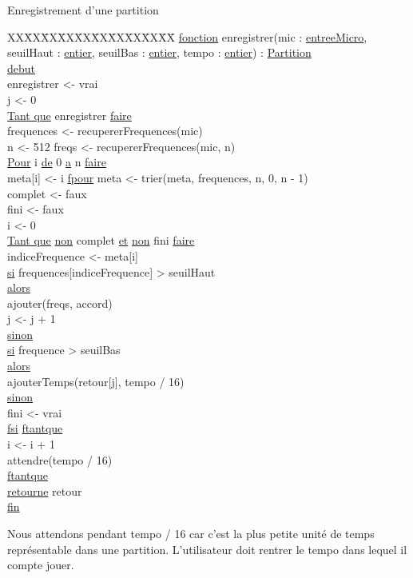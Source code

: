 Enregistrement d'une partition\newline
\begin{tabbing}
\kill XX\=XX\=XX\=XX\=XX\=XX\=XX\=XX\=XX\=XX\=
\kill
\ul{fonction} enregistrer(mic : \ul{entreeMicro}, seuilHaut :  \ul{entier}, seuilBas : \ul{entier}, tempo : \ul{entier}) : \ul{Partition}\\
\ul{debut}\\
\>enregistrer <- vrai\\
\>j <- 0\\
\>\ul{Tant que} enregistrer \ul{faire}\\
    \>\>frequences <- recupererFrequences(mic)\\
    \>\>n <- 512
    \>\>freqs <- recupererFrequences(mic, n)\\
    \>\>\ul{Pour} i \ul{de} 0 \ul{a} n \ul{faire}\\
        \>\>\>meta[i] <- i
    \>\>\ul{fpour}
    \>\>meta <- trier(meta, frequences, n, 0, n - 1)\\
    \>\>complet <- faux\\
    \>\>fini <- faux\\
    \>\>i <- 0 \\
    \>\>\ul{Tant que} \ul{non} complet \ul{et} \ul{non} fini \ul{faire}\\
        \>\>\>indiceFrequence <- meta[i]\\
        \>\>\>\ul{si} frequences[indiceFrequence] > seuilHaut\\
        \>\>\>\ul{alors}\\
            \>\>\>\>ajouter(freqs, accord)\\
            \>\>\>\>j <- j + 1\\
        \>\>\>\ul{sinon}\\
            \>\>\>\>\ul{si} frequence > seuilBas\\
            \>\>\>\>\ul{alors}\\ 
                \>\>\>\>\>ajouterTemps(retour[j], tempo / 16)\\
            \>\>\>\>\ul{sinon}\\
                \>\>\>\>\>fini <- vrai\\
        \>\>\>\ul{fsi}
    \>\>\ul{ftantque}\\     
    \>\>i <- i + 1\\  
    \>\>attendre(tempo / 16)\\
\>\ul{ftantque}\\
\>\ul{retourne} retour \\
\ul{fin}\\
\end{tabbing}

Nous attendons pendant tempo / 16 car c'est la plus petite unité de temps représentable dans une partition. L'utilisateur doit rentrer le tempo dans lequel il compte jouer.


